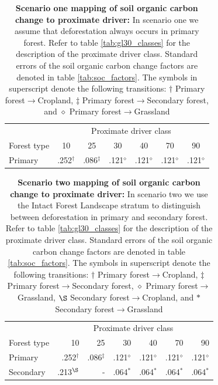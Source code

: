 		\begin{table}[ht]
			\centering
			\caption[Scenario one mapping of soil organic carbon change to porixmate driver]{\textbf{Scenario one mapping of soil organic carbon change to proximate driver:} In scenario one we assume that deforestation always occurs in primary forest. Refer to table \ref{tab:gl30_classes} for the description of the proximate driver class. Standard errors of the soil organic carbon change factors are denoted in table \ref{tab:soc_factors}. The symbols in superscript denote the following transitions: $\dagger$ Primary forest$\rightarrow$Cropland, $\ddagger$ Primary forest$\rightarrow$Secondary forest, and $\diamond$ Primary forest$\rightarrow$Grassland}
			\label{tab:scenario_one}
			\begin{tabular}{lcccccc}
				\hline
				& \multicolumn{6}{c}{Proximate driver class} \\
				Forest type & 10 & 25 & 30 & 40 & 70 & 90 \\
				\hline
				Primary & .252$^\mathbf{\dagger}$ & .086$^\mathbf{\ddagger}$ & .121$^\mathbf{\diamond}$ & .121$^\mathbf{\diamond}$ & .121$^\mathbf{\diamond}$ & .121$^\mathbf{\diamond}$ \\
				\hline
			\end{tabular}
		\end{table}
		\begin{table}[ht]
			\centering
			\caption[Scenario two mapping of soil organic carbon change to porixmate driver]{\textbf{Scenario two mapping of soil organic carbon change to proximate driver:} In scenario two we use the Intact Forest Landscape stratum to distinguish between deforestation in primary and secondary forest. Refer to table \ref{tab:gl30_classes} for the description of the proximate driver class. Standard errors of the soil organic carbon change factors are denoted in table \ref{tab:soc_factors}. The symbols in superscript denote the following transitions: $\dagger$ Primary forest$\rightarrow$Cropland, $\ddagger$ Primary forest$\rightarrow$Secondary forest, $\diamond$ Primary forest$\rightarrow$Grassland, $\S$ Secondary forest$\rightarrow$Cropland, and $*$ Secondary forest$\rightarrow$Grassland}
			\label{tab:scenario_two}
			\begin{tabular}{lrrrrrr}
				\hline
				& \multicolumn{6}{c}{Proximate driver class} \\
				Forest type & 10 & 25 & 30 & 40 & 70 & 90 \\
				\hline
				Primary & .252$^\mathbf{\dagger}$ & .086$^\mathbf{\ddagger}$ & .121$^\mathbf{\diamond}$ & .121$^\mathbf{\diamond}$ & .121$^\mathbf{\diamond}$ & .121$^\mathbf{\diamond}$ \\
				Secondary & .213$^\mathbf{\S}$ & - & .064$^\mathbf{*}$ & .064$^\mathbf{*}$ & .064$^\mathbf{*}$ & .064$^\mathbf{*}$\\
				\hline
			\end{tabular}
		\end{table}


